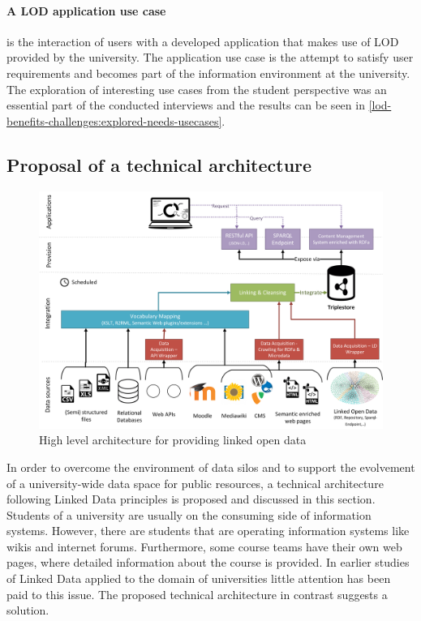 \documentclass{article}
\begin{document}
\paragraph{A LOD application use case} 
\label{technical-architecture-challenges:lod-effort:use-case}
is the interaction of users with a developed application that makes use of LOD provided by the university. The application use case is the attempt to satisfy user requirements and becomes part of the information environment at the university. The exploration of interesting use cases from the student perspective was an essential part of the conducted interviews and the results can be seen in \ref{lod-benefits-challenges:explored-needs-usecases}.

\subsection{Proposal of a technical architecture}
\label{technical-architecture-challenges:proposal}

\begin{figure}[t]
\centering \includegraphics*[width=1.0\columnwidth]{images/technical-architecture/lod_technical_architecture.png}
\caption{High level architecture for providing linked open data}
\label{fig:tac-high-level-architecture}
\end{figure}

In order to overcome the environment of data silos and to support the evolvement of a university-wide data space for public resources, a technical architecture following Linked Data principles is proposed and discussed in this section. Students of a university are usually on the consuming side of information systems. However, there are students that are operating information systems like wikis and internet forums. Furthermore, some course teams have their own web pages, where detailed information about the course is provided. In earlier studies of Linked Data applied to the domain of universities little attention has been paid to this issue. The proposed technical architecture in contrast suggests a solution.
\end{document}
